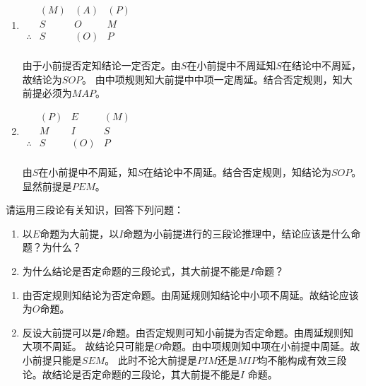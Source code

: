 \documentclass{ctexart}
\begin{document}
\begin{solution}
  \begin{enumerate}
    \item \(\begin{matrix}
                   & ({M}) & ({A}) & ({P}) \\
                   & S     & O     & M     \\
        \hline
        \therefore & S     & ({O}) & P     \\

      \end{matrix}\)

      由于小前提否定知结论一定否定。由\(S\)在小前提中不周延知\(S\)在结论中不周延，故结论为\(SOP\)。
      由中项规则知大前提中中项一定周延。结合否定规则，知大前提必须为\(MAP\)。
    \item \(\begin{matrix}
                   & ({P}) & E     & ({M}) \\
                   & M     & I     & S     \\
        \hline
        \therefore & S     & ({O}) & P     \\

      \end{matrix}\)

      由\(S\)在小前提中不周延，知\(S\)在结论中不周延。结合否定规则，知结论为\(SOP\)。
      显然前提是\(PEM\)。
  \end{enumerate}
\end{solution}
\begin{problem}\label{pro:8}
  请运用三段论有关知识，回答下列问题：
  \begin{enumerate}
    \item 以\(E\)命题为大前提，以\(I\)命题为小前提进行的三段论推理中，结论应该是什么命题？为什么？
    \item 为什么结论是否定命题的三段论式，其大前提不能是\(I\)命题？
  \end{enumerate}
\end{problem}
\begin{solution}
  \begin{enumerate}
    \item 由否定规则知结论为否定命题。由周延规则知结论中小项不周延。故结论应该为\(O\)命题。
    \item 反设大前提可以是\(I\)命题。由否定规则可知小前提为否定命题。由周延规则知大项不周延。
      故结论只可能是\(O\)命题。由中项规则知中项在小前提中周延。故小前提只能是\(SEM\)。
      此时不论大前提是\(PIM\)还是\(MIP\)均不能构成有效三段论。故结论是否定命题的三段论，其大前提不能是\(I\) 命题。
  \end{enumerate}
\end{solution}
\end{document}
